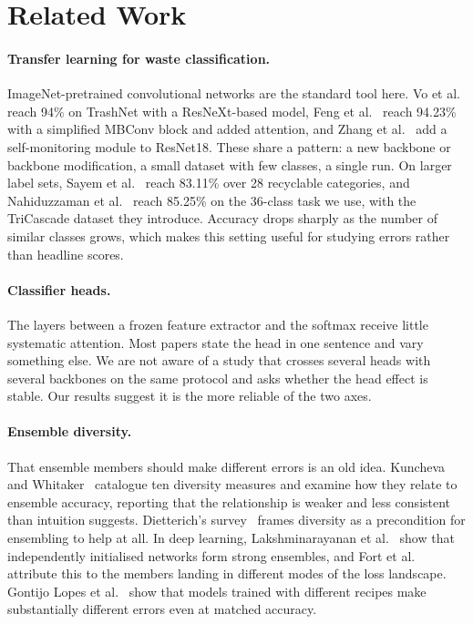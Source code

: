 \documentclass[runningheads]{llncs}
\begin{document}
\section{Related Work}

\paragraph{Transfer learning for waste classification.}
ImageNet-pretrained convolutional networks are the standard tool here.
Vo et al.~\cite{vo2019novel} reach 94\% on TrashNet with a ResNeXt-based model,
Feng et al.~\cite{feng2022intelligent} reach 94.23\% with a simplified MBConv
block and added attention, and Zhang et al.~\cite{zhang2021} add a
self-monitoring module to ResNet18. These share a pattern: a new backbone or
backbone modification, a small dataset with few classes, a single run. On
larger label sets, Sayem et al.~\cite{sayem2025enhancing} reach 83.11\% over 28
recyclable categories, and Nahiduzzaman et al.~\cite{nahiduzzaman2025automated}
reach 85.25\% on the 36-class task we use, with the TriCascade dataset they
introduce. Accuracy drops sharply as the number of similar classes grows, which
makes this setting useful for studying errors rather than headline scores.

\paragraph{Classifier heads.}
The layers between a frozen feature extractor and the softmax receive little
systematic attention. Most papers state the head in one sentence and vary
something else. We are not aware of a study that crosses several heads with
several backbones on the same protocol and asks whether the head effect is
stable. Our results suggest it is the more reliable of the two axes.

\paragraph{Ensemble diversity.}
That ensemble members should make different errors is an old idea. Kuncheva and
Whitaker~\cite{kuncheva2003measures} catalogue ten diversity measures and
examine how they relate to ensemble accuracy, reporting that the relationship
is weaker and less consistent than intuition suggests. Dietterich's
survey~\cite{dietterich2000ensemble} frames diversity as a precondition for
ensembling to help at all. In deep learning, Lakshminarayanan et
al.~\cite{lakshminarayanan2017simple} show that independently initialised
networks form strong ensembles, and Fort et al.~\cite{fort2019deep} attribute
this to the members landing in different modes of the loss landscape.
Gontijo Lopes et al.~\cite{gontijolopes2022one} show that models trained with
different recipes make substantially different errors even at matched accuracy.
\end{document}
